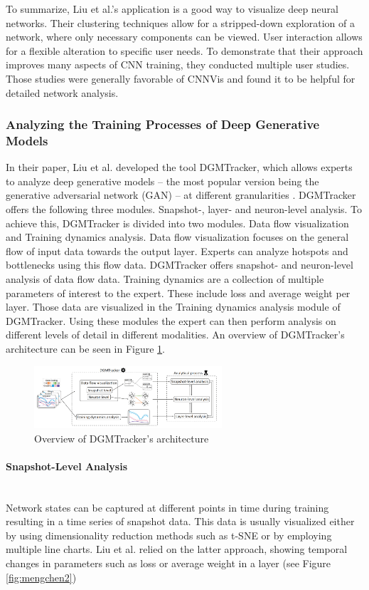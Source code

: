 \documentclass{acmsiggraph}               %
\newcommand{\paragraphbr}[1]{\paragraph{#1}\mbox{}\\}
\begin{document}
To summarize, Liu et al.'s application is a good way to visualize deep neural networks. Their clustering techniques allow for a stripped-down exploration of a network, where only necessary components can be viewed. User interaction allows for a flexible alteration to specific user needs. To demonstrate that their approach improves many aspects of CNN training, they conducted multiple user studies. Those studies were generally favorable of CNNVis and found it to be helpful for detailed network analysis.

\subsubsection{Analyzing the Training Processes of Deep Generative Models}
In their paper, Liu et al. developed the tool DGMTracker, which allows experts to analyze deep generative models -- the most popular version being the generative adversarial network (GAN) -- at different granularities \cite{Liu2018}. 
DGMTracker offers the following three modules. Snapshot-, layer- and neuron-level analysis.
To achieve this, DGMTracker is divided into two modules. Data flow visualization and Training dynamics analysis.
Data flow visualization focuses on the general flow of input data towards the output layer. Experts can analyze hotspots and bottlenecks using this flow data. DGMTracker offers snapshot- and neuron-level analysis of data flow data.
Training dynamics are a collection of multiple parameters of interest to the expert. These include loss and average weight per layer. Those data are visualized in the Training dynamics analysis module of DGMTracker.
Using these modules the expert can then perform analysis on different levels of detail in different modalities.
An overview of DGMTracker's architecture can be seen in Figure \ref{fig:mengchen1}.

\begin{figure}[!htb]
  \centering
  \includegraphics[width=2.75in]{mengchen1}
  \caption{Overview of DGMTracker's architecture \protect\cite{Liu2018}}
  \label{fig:mengchen1}
\end{figure}

\paragraphbr{Snapshot-Level Analysis}

Network states can be captured at different points in time during training resulting in a time series of snapshot data.
This data is usually visualized either by using dimensionality reduction methods such as t-SNE or by employing multiple line charts. 
Liu et al. relied on the latter approach, showing temporal changes in parameters such as loss or average weight in a layer (see Figure \ref{fig:mengchen2})
\end{document}
